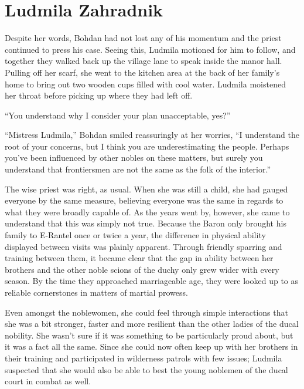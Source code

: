 \chapter{Ludmila Zahradnik}

Despite her words, Bohdan had not lost any of his momentum and the priest continued to press his case. Seeing this, Ludmila motioned for him to follow, and together they walked back up the village lane to speak inside the manor hall. Pulling off her scarf, she went to the kitchen area at the back of her family’s home to bring out two wooden cups filled with cool water. Ludmila moistened her throat before picking up where they had left off.

 

“You understand why I consider your plan unacceptable, yes?”

 

“Mistress Ludmila,” Bohdan smiled reassuringly at her worries, “I understand the root of your concerns, but I think you are underestimating the people. Perhaps you’ve been influenced by other nobles on these matters, but surely you understand that frontiersmen are not the same as the folk of the interior.”

 

The wise priest was right, as usual. When she was still a child, she had gauged everyone by the same measure, believing everyone was the same in regards to what they were broadly capable of. As the years went by, however, she came to understand that this was simply not true. Because the Baron only brought his family to E-Rantel once or twice a year, the difference in physical ability displayed between visits was plainly apparent. Through friendly sparring and training between them, it became clear that the gap in ability between her brothers and the other noble scions of the duchy only grew wider with every season. By the time they approached marriageable age, they were looked up to as reliable cornerstones in matters of martial prowess.

 

Even amongst the noblewomen, she could feel through simple interactions that she was a bit stronger, faster and more resilient than the other ladies of the ducal nobility. She wasn’t sure if it was something to be particularly proud about, but it was a fact all the same. Since she could now often keep up with her brothers in their training and participated in wilderness patrols with few issues; Ludmila suspected that she would also be able to best the young noblemen of the ducal court in combat as well.

